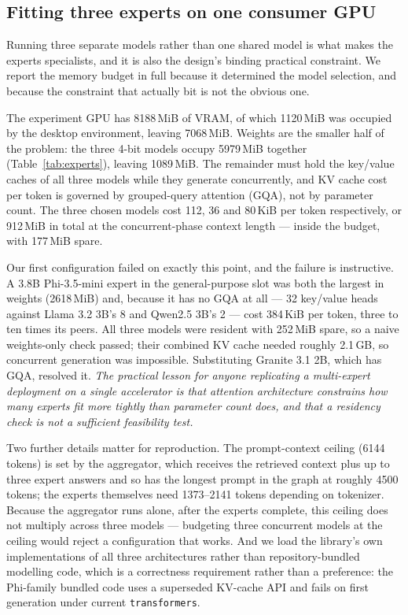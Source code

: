 \documentclass[journal,10pt,compsoc,onecolumn]{IEEEtran}
\begin{document}
\subsection{Fitting three experts on one consumer GPU}
\label{sec:memory}
Running three separate models rather than one shared model is what makes the
experts specialists, and it is also the design's binding practical constraint. We
report the memory budget in full because it determined the model selection, and
because the constraint that actually bit is not the obvious one.

The experiment GPU has 8188\,MiB of VRAM, of which 1120\,MiB was occupied by the
desktop environment, leaving 7068\,MiB. Weights are the smaller half of the
problem: the three 4-bit models occupy 5979\,MiB together
(Table~\ref{tab:experts}), leaving 1089\,MiB. The remainder must hold the
key/value caches of all three models while they generate concurrently, and KV
cache cost per token is governed by grouped-query attention (GQA), not by
parameter count. The three chosen models cost 112, 36 and 80\,KiB per token
respectively, or 912\,MiB in total at the concurrent-phase context length ---
inside the budget, with 177\,MiB spare.

Our first configuration failed on exactly this point, and the failure is
instructive. A 3.8B Phi-3.5-mini expert in the general-purpose slot was both the
largest in weights (2618\,MiB) and, because it has no GQA at all --- 32 key/value
heads against Llama 3.2 3B's 8 and Qwen2.5 3B's 2 --- cost 384\,KiB per token,
three to ten times its peers. All three models were resident with 252\,MiB
spare, so a naive weights-only check passed; their combined KV cache needed
roughly 2.1\,GB, so concurrent generation was impossible. Substituting Granite
3.1 2B, which has GQA, resolved it. \emph{The practical lesson for anyone
replicating a multi-expert deployment on a single accelerator is that attention
architecture constrains how many experts fit more tightly than parameter count
does, and that a residency check is not a sufficient feasibility test.}

Two further details matter for reproduction. The prompt-context ceiling
(6144 tokens) is set by the aggregator, which receives the retrieved context plus
up to three expert answers and so has the longest prompt in the graph at roughly
4500 tokens; the experts themselves need 1373--2141 tokens depending on
tokenizer. Because the aggregator runs alone, after the experts complete, this
ceiling does not multiply across three models --- budgeting three concurrent
models at the ceiling would reject a configuration that works. And we load the
library's own implementations of all three architectures rather than
repository-bundled modelling code, which is a correctness requirement rather than
a preference: the Phi-family bundled code uses a superseded KV-cache API and
fails on first generation under current \texttt{transformers}.
\end{document}

